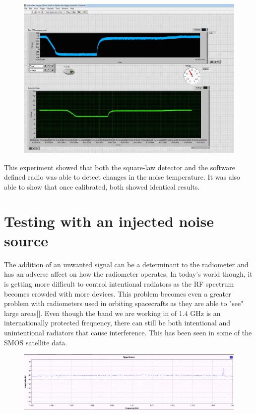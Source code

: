 \begin{figure}[h!tb] \centering

\includegraphics[width=\textwidth]{Images/labviewx2_lab0.png}

\label{labview_tpr}
\end{figure}

This experiment showed that both the square-law detector and the software defined radio was able to detect changes in the noise temperature.  It was also able to show that once calibrated, both showed identical results.

\section{Testing with an injected noise source}
The addition of an unwanted signal can be a determinant to the radiometer and has an adverse affect on how the radiometer operates.  In today's world though, it is getting more difficult to control intentional radiators as the RF spectrum becomes crowded with more devices.  This problem becomes even a greater problem with radiometers used in orbiting spacecrafts as they are able to "see" large areas[\cite{DeRooRFI}].  Even though the band we are working in of 1.4 GHz is an internationally protected frequency, there can still be both intentional and unintentional radiators that cause interference.  This has been seen in some of the SMOS satellite data.

\begin{figure}[h!tb] \centering

\includegraphics[width=\textwidth]{Images/interfering_signal_edit.png}

\label{inter_signal}
\end{figure}

